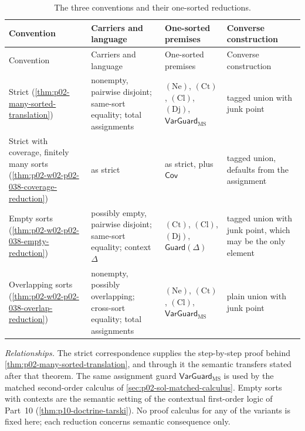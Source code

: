 \begin{longtable}{@{}p{.22\linewidth}p{.22\linewidth}p{.22\linewidth}p{.24\linewidth}@{}}
\caption{The three conventions and their one-sorted reductions.}
\label{tab:p02-w02-p02-038-conventions}\\
\toprule
Convention & Carriers and language & One-sorted premises & Converse construction \\ \midrule
\endfirsthead
\toprule
Convention & Carriers and language & One-sorted premises & Converse construction \\ \midrule
\endhead
Strict (\cref{thm:p02-many-sorted-translation}) &
nonempty, pairwise disjoint; same-sort equality; total assignments &
\((\mathrm{Ne})\), \((\mathrm{Ct})\), \((\mathrm{Cl})\), \((\mathrm{Dj})\),
\(\mathsf{VarGuard}_{\mathrm{MS}}\) &
tagged union with junk point \\
\addlinespace
Strict with coverage, finitely many sorts
(\cref{thm:p02-w02-p02-038-coverage-reduction}) &
as strict &
as strict, plus \(\mathsf{Cov}\) &
tagged union, defaults from the assignment \\
\addlinespace
Empty sorts (\cref{thm:p02-w02-p02-038-empty-reduction}) &
possibly empty, pairwise disjoint; same-sort equality; context \(\Delta\) &
\((\mathrm{Ct})\), \((\mathrm{Cl})\), \((\mathrm{Dj})\),
\(\mathsf{Guard}(\Delta)\) &
tagged union with junk point, which may be the only element \\
\addlinespace
Overlapping sorts (\cref{thm:p02-w02-p02-038-overlap-reduction}) &
nonempty, possibly overlapping; cross-sort equality; total assignments &
\((\mathrm{Ne})\), \((\mathrm{Ct})\), \((\mathrm{Cl})\),
\(\mathsf{VarGuard}_{\mathrm{MS}}\) &
plain union with junk point \\
\bottomrule
\end{longtable}

\emph{Relationships.}  The strict correspondence supplies the step-by-step
proof behind \cref{thm:p02-many-sorted-translation}, and through it the
semantic transfers stated after that theorem.  The same assignment guard
\(\mathsf{VarGuard}_{\mathrm{MS}}\) is used by the matched second-order
calculus of \cref{sec:p02-sol-matched-calculus}.  Empty sorts with
contexts are the semantic setting of the contextual first-order logic of
Part~10 (\cref{thm:p10-doctrine-tarski}).  No proof calculus for any of the
variants is fixed here; each reduction concerns semantic consequence only.
